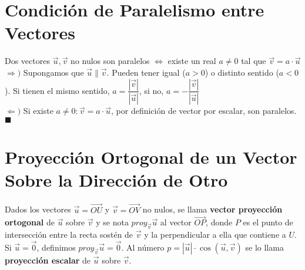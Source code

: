 \documentclass[11pt,a4paper]{article}
\newcommand*{\QEDA}{\null\nobreak\hfill\ensuremath{\blacksquare}}
\begin{document}
\section{Condici\'on de Paralelismo entre Vectores}
\noindent Dos vectores $\overrightarrow{u},\overrightarrow{v}$ no nulos son paralelos $\iff$ existe un real $a\not=0$ tal que $\overrightarrow{v} = a \cdot\overrightarrow{u}$\\
$\Rightarrow)$ Supongamos que $\overrightarrow{u} \parallel \overrightarrow{v}$. Pueden tener igual ($a>0$) o distinto sentido ($a<0$). Si tienen el mismo sentido, $a=\dfrac{|\overrightarrow{v}|}{|\overrightarrow{u}|}$, si no, $a=-\dfrac{|\overrightarrow{v}|}{|\overrightarrow{u}|}$\\
$\Leftarrow)$ Si existe $a\not=0 : \overrightarrow{v} = a\cdot\overrightarrow{u}$, por definici\'on de vector por escalar, son paralelos. \QEDA

\newpage

\section{Proyecci\'on Ortogonal de un Vector Sobre la Direcci\'on de Otro}
\noindent Dados los vectores $\overrightarrow{u} = \overrightarrow{OU}$ y $\overrightarrow{v} = \overrightarrow{OV}$ no nulos, se llama \textbf{vector proyecci\'on ortogonal} de $\overrightarrow{u}$ sobre $\overrightarrow{v}$ y se nota $proy_{\overrightarrow{v}}\overrightarrow{u}$ al vector $\overrightarrow{OP}$, donde $P$ es el punto de intersecci\'on entre la recta sost\'en de $\overrightarrow{v}$ y la perpendicular a ella que contiene a $U$. Si $\overrightarrow{u} = \overrightarrow{0}$, definimos $proy_{\overrightarrow{v}}\overrightarrow{u} = \overrightarrow{0}$. Al n\'umero $p=|\overrightarrow{u}|\cdot\cos (\overrightarrow{u},\overrightarrow{v})$ se lo llama \textbf{proyecci\'on escalar} de $\overrightarrow{u}$ sobre $\overrightarrow{v}$.
\end{document}
